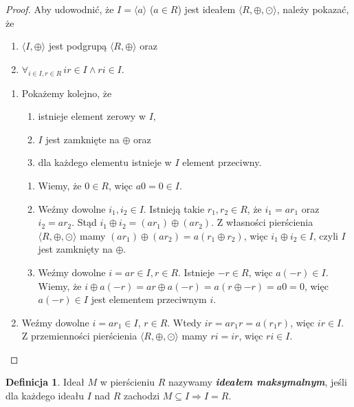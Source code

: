 \documentclass[declaration,shortabstract]{iithesis}
\theoremstyle{definition}
\newtheorem{definition}{Definicja}
\theoremstyle{remark} \newtheorem{observation}{Obserwacja}
\theoremstyle{plain} \newtheorem{theorem}{Twierdzenie}
\theoremstyle{plain} \newtheorem{lemma}{Lemat}
\theoremstyle{remark} \newtheorem*{remark*}{Uwaga}
\theoremstyle{reminder} \newtheorem*{reminder*}{Przypomnienie}
\begin{document}
\begin{proof}
	Aby udowodnić, że $I = \langle a \rangle$ ($a \in R$) jest ideałem $\langle R, \oplus, \odot \rangle$, należy pokazać, że 
	\begin{enumerate}[label=\arabic*., leftmargin=.4in]
		\item $\langle I, \oplus \rangle$ jest podgrupą $\langle R, \oplus \rangle$ oraz 
		\item $\forall_{i \in I, r \in R} \, ir \in I \wedge ri \in I $.
	\end{enumerate}
	\begin{enumerate}[label={Ad.\arabic*.}, leftmargin=.4in]
		\item Pokażemy kolejno, że
		      \begin{enumerate}[label=1.\arabic*., leftmargin=.4in] 
		      	\item istnieje element zerowy w $I$, 
		      	\item $I$ jest zamknięte na $\oplus$ oraz 
		      	\item dla każdego elementu istnieje w $I$ element przeciwny.
		      \end{enumerate}
		      \begin{enumerate}[label=Ad.1.\arabic*]
		      	\item Wiemy, że $0 \in R$, więc $a0=0 \in I$.
		      	\item Weźmy dowolne $i_1, i_2 \in I$. Istnieją takie $r_1, r_2 \in R$, że $i_1 = ar_1$ oraz $i_2 = ar_2$. Stąd $i_1 \oplus i_2 = (ar_1) \oplus (ar_2)$. Z własności pierścienia $\langle R, \oplus, \odot \rangle$ mamy $(ar_1) \oplus (ar_2) = a(r_1 \oplus r_2)$, więc $i_1 \oplus i_2 \in I$, czyli $I$ jest zamknięty na $\oplus$.
		      	\item Weźmy dowolne $i = ar \in I, r \in R$. Istnieje $-r \in R$, więc $a(-r) \in I$. Wiemy, że $i \oplus a(-r) = ar \oplus a(-r) = a(r \oplus -r) = a0 = 0$, więc $a(-r) \in I$ jest elementem przeciwnym $i$.
		      \end{enumerate}
		\item Weźmy dowolne $i = ar_1 \in I, \, r \in R$. Wtedy $ir = ar_1r = a(r_1r)$, więc $ir \in I$. Z przemienności pierścienia $\langle R, \oplus, \odot \rangle$ mamy $ri = ir$, więc $ri \in I$.
	\end{enumerate}
\end{proof}

\theoremstyle{definition}
\begin{definition}
	Ideał $M$ w pierścieniu $R$ nazywamy \textit{\textbf{ideałem maksymalnym}}, jeśli dla każdego ideału $I$ nad $R$ zachodzi $M \subseteq I \Rightarrow I = R$.
\end{definition}
\end{document}
